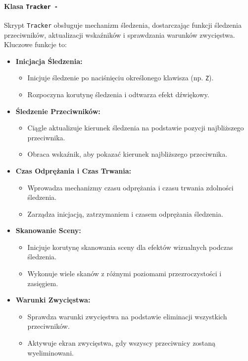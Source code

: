 \paragraph{Klasa \texttt{Tracker -}}
Skrypt \texttt{Tracker} obsługuje mechanizm śledzenia, dostarczając funkcji śledzenia przeciwników, aktualizacji wskaźników i sprawdzania warunków zwycięstwa. Kluczowe funkcje to:
\begin{itemize}
\item \textbf{Inicjacja Śledzenia:}
\begin{itemize}
\item Inicjuje śledzenie po naciśnięciu określonego klawisza (np. \texttt{Z}).
\item Rozpoczyna korutynę śledzenia i odtwarza efekt dźwiękowy.
\end{itemize}
\item \textbf{Śledzenie Przeciwników:}
\begin{itemize}
\item Ciągle aktualizuje kierunek śledzenia na podstawie pozycji najbliższego przeciwnika.
\item Obraca wskaźnik, aby pokazać kierunek najbliższego przeciwnika.
\end{itemize}
\item \textbf{Czas Odprężania i Czas Trwania:}
\begin{itemize}
\item Wprowadza mechanizmy czasu odprężania i czasu trwania zdolności śledzenia.
\item Zarządza inicjacją, zatrzymaniem i czasem odprężania śledzenia.
\end{itemize}
\item \textbf{Skanowanie Sceny:}
\begin{itemize}
\item Inicjuje korutynę skanowania sceny dla efektów wizualnych podczas śledzenia.
\item Wykonuje wiele skanów z różnymi poziomami przezroczystości i zasięgiem.
\end{itemize}
\item \textbf{Warunki Zwycięstwa:}
\begin{itemize}
\item Sprawdza warunki zwycięstwa na podstawie eliminacji wszystkich przeciwników.
\item Aktywuje ekran zwycięstwa, gdy wszyscy przeciwnicy zostaną wyeliminowani.
\end{itemize}
\end{itemize}

